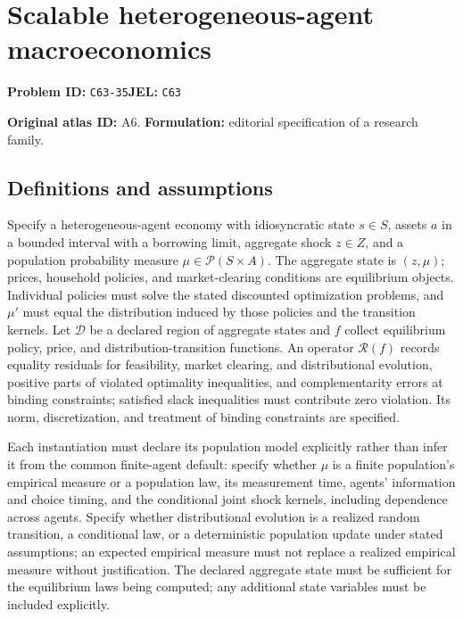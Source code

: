 \documentclass[11pt,a4paper]{article}
\begin{document}
\section*{Scalable heterogeneous-agent macroeconomics}
\textbf{Problem ID:} \texttt{C63-35}\quad \textbf{JEL:} \texttt{C63}\par
\label{problem:OP-0016}
\label{atlas:prob:A6}

\noindent\textbf{Original atlas ID:} A6. \textbf{Formulation:} editorial specification of a research family.

\subsection*{Definitions and assumptions}

Specify a heterogeneous-agent economy with idiosyncratic state $s\in S$, assets $a$ in a bounded interval with a borrowing limit, aggregate shock $z\in Z$, and a population probability measure $\mu\in\mathcal P(S\times A)$. The aggregate state is $(z,\mu)$; prices, household policies, and market-clearing conditions are equilibrium objects. Individual policies must solve the stated discounted optimization problems, and $\mu'$ must equal the distribution induced by those policies and the transition kernels. Let $\mathcal D$ be a declared region of aggregate states and $f$ collect equilibrium policy, price, and distribution-transition functions. An operator $\mathcal R(f)$ records equality residuals for feasibility, market clearing, and distributional evolution, positive parts of violated optimality inequalities, and complementarity errors at binding constraints; satisfied slack inequalities must contribute zero violation. Its norm, discretization, and treatment of binding constraints are specified.

Each instantiation must declare its population model explicitly rather than infer it from the common finite-agent default: specify whether $\mu$ is a finite population's empirical measure or a population law, its measurement time, agents' information and choice timing, and the conditional joint shock kernels, including dependence across agents. Specify whether distributional evolution is a realized random transition, a conditional law, or a deterministic population update under stated assumptions; an expected empirical measure must not replace a realized empirical measure without justification. The declared aggregate state must be sufficient for the equilibrium laws being computed; any additional state variables must be included explicitly.
\end{document}
